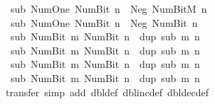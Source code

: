\begin{isabellebody}
\ \ {\isachardoublequoteopen}sub\ Num{\isachardot}{\kern0pt}One\ {\isacharparenleft}{\kern0pt}Num{\isachardot}{\kern0pt}Bit{}\ n{\isacharparenright}{\kern0pt}\ {\isacharequal}{\kern0pt}\ Neg\ {\isacharparenleft}{\kern0pt}Num{\isachardot}{\kern0pt}BitM\ n{\isacharparenright}{\kern0pt}{\isachardoublequoteclose}\isanewline
\ \ {\isachardoublequoteopen}sub\ Num{\isachardot}{\kern0pt}One\ {\isacharparenleft}{\kern0pt}Num{\isachardot}{\kern0pt}Bit{}\ n{\isacharparenright}{\kern0pt}\ {\isacharequal}{\kern0pt}\ Neg\ {\isacharparenleft}{\kern0pt}Num{\isachardot}{\kern0pt}Bit{}\ n{\isacharparenright}{\kern0pt}{\isachardoublequoteclose}\isanewline
\ \ {\isachardoublequoteopen}sub\ {\isacharparenleft}{\kern0pt}Num{\isachardot}{\kern0pt}Bit{}\ m{\isacharparenright}{\kern0pt}\ {\isacharparenleft}{\kern0pt}Num{\isachardot}{\kern0pt}Bit{}\ n{\isacharparenright}{\kern0pt}\ {\isacharequal}{\kern0pt}\ dup\ {\isacharparenleft}{\kern0pt}sub\ m\ n{\isacharparenright}{\kern0pt}{\isachardoublequoteclose}\isanewline
\ \ {\isachardoublequoteopen}sub\ {\isacharparenleft}{\kern0pt}Num{\isachardot}{\kern0pt}Bit{}\ m{\isacharparenright}{\kern0pt}\ {\isacharparenleft}{\kern0pt}Num{\isachardot}{\kern0pt}Bit{}\ n{\isacharparenright}{\kern0pt}\ {\isacharequal}{\kern0pt}\ dup\ {\isacharparenleft}{\kern0pt}sub\ m\ n{\isacharparenright}{\kern0pt}{\isachardoublequoteclose}\isanewline
\ \ {\isachardoublequoteopen}sub\ {\isacharparenleft}{\kern0pt}Num{\isachardot}{\kern0pt}Bit{}\ m{\isacharparenright}{\kern0pt}\ {\isacharparenleft}{\kern0pt}Num{\isachardot}{\kern0pt}Bit{}\ n{\isacharparenright}{\kern0pt}\ {\isacharequal}{\kern0pt}\ dup\ {\isacharparenleft}{\kern0pt}sub\ m\ n{\isacharparenright}{\kern0pt}\ {\isacharplus}{\kern0pt}\ {}{\isachardoublequoteclose}\isanewline
\ \ {\isachardoublequoteopen}sub\ {\isacharparenleft}{\kern0pt}Num{\isachardot}{\kern0pt}Bit{}\ m{\isacharparenright}{\kern0pt}\ {\isacharparenleft}{\kern0pt}Num{\isachardot}{\kern0pt}Bit{}\ n{\isacharparenright}{\kern0pt}\ {\isacharequal}{\kern0pt}\ dup\ {\isacharparenleft}{\kern0pt}sub\ m\ n{\isacharparenright}{\kern0pt}\ {\isacharminus}{\kern0pt}\ {}{\isachardoublequoteclose}\isanewline
%
\isadelimproof
\ \ %
\endisadelimproof
%
\isatagproof
{}\isamarkupfalse%
\ {\isacharparenleft}{\kern0pt}transfer{\isacharcomma}{\kern0pt}\ simp\ add{\isacharcolon}{\kern0pt}\ dbl{\isacharunderscore}{\kern0pt}def\ dbl{\isacharunderscore}{\kern0pt}inc{\isacharunderscore}{\kern0pt}def\ dbl{\isacharunderscore}{\kern0pt}dec{\isacharunderscore}{\kern0pt}def{\isacharparenright}{\kern0pt}{\isacharplus}{\kern0pt}%

\end{isabellebody}
